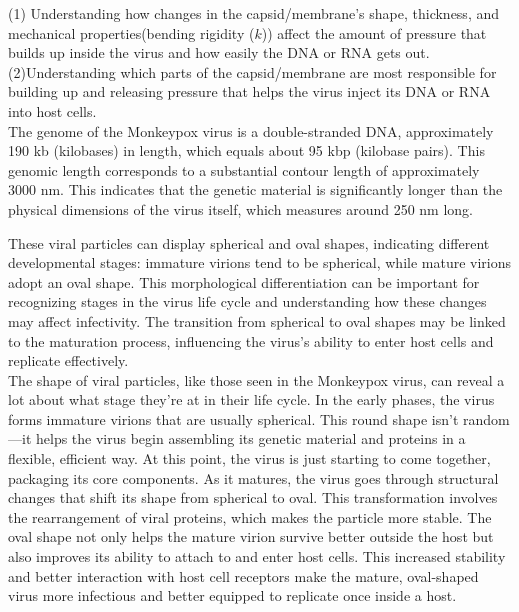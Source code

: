 \documentclass[12pt]{article}
\begin{document}
\begin{flushleft}
\noindent (1) Understanding how changes in the capsid/membrane's shape, thickness, and mechanical properties(bending rigidity ($k$)) affect the amount of pressure that builds up inside the virus and how easily the DNA or RNA gets out.\\

\noindent (2)Understanding which parts of the capsid/membrane are most responsible for building up and releasing pressure that helps the virus inject its DNA or RNA into host cells.\\


The genome of the Monkeypox virus is a double-stranded DNA, approximately 190 kb (kilobases) in length, which equals about 95 kbp (kilobase pairs). This genomic length corresponds to a substantial contour length of approximately 3000 nm. This indicates that the genetic material is significantly longer than the physical dimensions of the virus itself, which measures around 250 nm long. 	
	
	
	
		

These viral particles can display spherical and oval shapes, indicating different developmental stages: immature virions tend to be spherical, while mature virions adopt an oval shape. This morphological differentiation can be important for recognizing stages in the virus life cycle and understanding how these changes may affect infectivity. The transition from spherical to oval shapes may be linked to the maturation process, influencing the virus's ability to enter host cells and replicate effectively.\\

The shape of viral particles, like those seen in the Monkeypox virus, can reveal a lot about what stage they’re at in their life cycle. In the early phases, the virus forms immature virions that are usually spherical. This round shape isn’t random—it helps the virus begin assembling its genetic material and proteins in a flexible, efficient way. At this point, the virus is just starting to come together, packaging its core components. As it matures, the virus goes through structural changes that shift its shape from spherical to oval. This transformation involves the rearrangement of viral proteins, which makes the particle more stable. The oval shape not only helps the mature virion survive better outside the host but also improves its ability to attach to and enter host cells. This increased stability and better interaction with host cell receptors make the mature, oval-shaped virus more infectious and better equipped to replicate once inside a host.





\end{flushleft}
\end{document}

